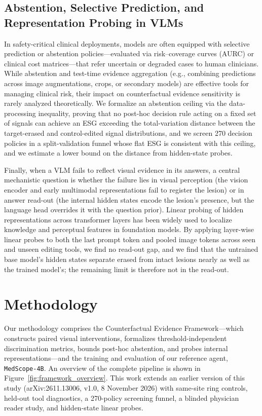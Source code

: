 \documentclass[5p,times,twocolumn,authoryear]{elsarticle}
\begin{document}
\subsection{Abstention, Selective Prediction, and Representation Probing in VLMs}
\label{subsec:rw_abstention}
In safety-critical clinical deployments, models are often equipped with selective prediction or abstention policies---evaluated via risk--coverage curves (AURC) \citep{geifman2017selective} or clinical cost matrices---that refer uncertain or degraded cases to human clinicians. While abstention and test-time evidence aggregation (e.g., combining predictions across image augmentations, crops, or secondary models) are effective tools for managing clinical risk, their impact on counterfactual evidence sensitivity is rarely analyzed theoretically. We formalize an abstention ceiling via the data-processing inequality, proving that no post-hoc decision rule acting on a fixed set of signals can achieve an ESG exceeding the total-variation distance between the target-erased and control-edited signal distributions, and we screen 270 decision policies in a split-validation funnel whose flat ESG is consistent with this ceiling, and we estimate a lower bound on the distance from hidden-state probes.

Finally, when a VLM fails to reflect visual evidence in its answers, a central mechanistic question is whether the failure lies in visual perception (the vision encoder and early multimodal representations fail to register the lesion) or in answer read-out (the internal hidden states encode the lesion's presence, but the language head overrides it with the question prior). Linear probing of hidden representations across transformer layers \citep{alain2016understanding} has been widely used to localize knowledge and perceptual features in foundation models. By applying layer-wise linear probes to both the last prompt token and pooled image tokens across seen and unseen editing tools, we find no read-out gap, and we find that the untrained base model's hidden states separate erased from intact lesions nearly as well as the trained model's; the remaining limit is therefore not in the read-out.

\section{Methodology}
\label{sec:method}
Our methodology comprises the Counterfactual Evidence Framework---which constructs paired visual interventions, formalizes threshold-independent discrimination metrics, bounds post-hoc abstention, and probes internal representations---and the training and evaluation of our reference agent, \texttt{MedScope-4B}. An overview of the complete pipeline is shown in Figure~\ref{fig:framework_overview}. This work extends an earlier version of this study \citep{gurram2026medscope} (arXiv:2611.13006, v1.0, 8 November 2026) with same-site ring controls, held-out tool diagnostics, a 270-policy screening funnel, a blinded physician reader study, and hidden-state linear probes.
\end{document}
